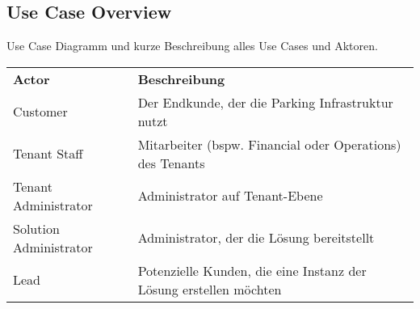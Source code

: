 \subsection{Use Case Overview}
Use Case Diagramm und kurze Beschreibung alles Use Cases und Aktoren.

\renewcommand{\arraystretch}{1.5}
{
\begin{longtable}{l p{10cm}}
    \textbf{Actor} & \textbf{Beschreibung} \\ [1ex]
    Customer & Der Endkunde, der die Parking Infrastruktur nutzt \\ [0.5ex]
    Tenant Staff & Mitarbeiter (bspw. Financial oder Operations) des Tenants \\ [0.5ex]
    Tenant Administrator & Administrator auf Tenant-Ebene \\ [0.5ex]
    Solution Administrator & Administrator, der die Lösung bereitstellt \\ [0.5ex]
    Lead & Potenzielle Kunden, die eine Instanz der Lösung erstellen möchten \\ 
\end{longtable}}